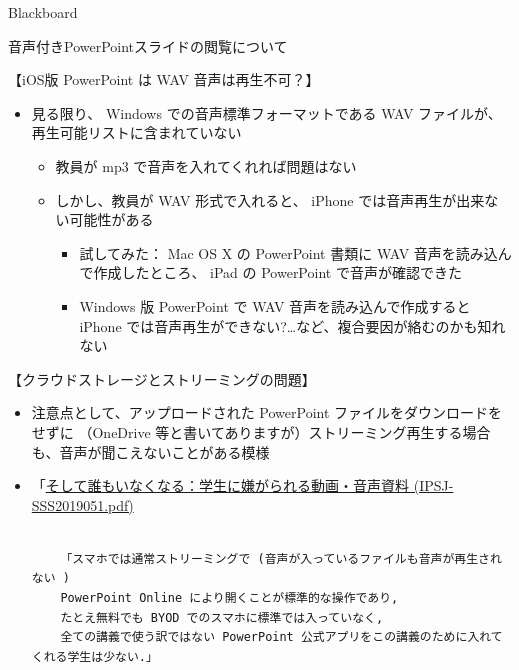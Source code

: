 \documentclass[a4j,10pt]{jsarticle}
\begin{document}
{\begin{frame}[label={sec:orgc119bb0},fragile]{Blackboard}
\begin{block}{音声付きPowerPointスライドの閲覧について}
\begin{block}{【iOS版 PowerPoint は WAV 音声は再生不可？】}
\begin{itemize}
\begin{itemize}
\item \href{https://support.microsoft.com/en-us/office/video-and-audio-file-formats-supported-in-powerpoint-d8b12450-26db-4c7b-a5c1-593d3418fb59}{Video and audio file formats supported in PowerPoint - Office Support}
\item \href{https://support.microsoft.com/en-us/office/file-formats-that-are-supported-in-powerpoint-252c6fa0-a4bc-41be-ac82-b77c9773f9dc}{File formats that are supported in PowerPoint - Office Support}
\end{itemize}
\par
\item 見る限り、 Windows での音声標準フォーマットである WAV ファイルが、再生可能リストに含まれていない
\begin{itemize}
\item 教員が mp3 で音声を入れてくれれば問題はない
\item しかし、教員が WAV 形式で入れると、 iPhone では音声再生が出来ない可能性がある
\begin{itemize}
\item 試してみた： Mac OS X の PowerPoint 書類に WAV 音声を読み込んで作成したところ、 iPad の PowerPoint で音声が確認できた
\item Windows 版 PowerPoint で WAV 音声を読み込んで作成すると iPhone では音声再生ができない?\ldots{}など、複合要因が絡むのかも知れない
\end{itemize}
\end{itemize}
\end{itemize}
\end{block}
\par
\begin{block}{【クラウドストレージとストリーミングの問題】}
\begin{itemize}
\item 注意点として、アップロードされた PowerPoint ファイルをダウンロードをせずに
（OneDrive 等と書いてありますが）ストリーミング再生する場合も、音声が聞こえないことがある模様
\item 「\href{https://ipsj.ixsq.nii.ac.jp/ej/?action=repository\_uri\&item\_id=198673\&file\_id=1\&file\_no=1}{そして誰もいなくなる：学生に嫌がられる動画・音声資料 (IPSJ-SSS2019051.pdf)}
\begin{verbatim}

    「スマホでは通常ストリーミングで (音声が入っているファイルも音声が再生されない )
    PowerPoint Online により開くことが標準的な操作であり,
    たとえ無料でも BYOD でのスマホに標準では入っていなく,
    全ての講義で使う訳ではない PowerPoint 公式アプリをこの講義のために入れてくれる学生は少ない.」\end{verbatim}


\end{itemize}
\end{block}
\end{block}
\end{frame}}
\end{document}
